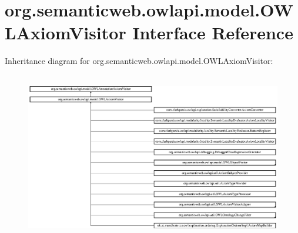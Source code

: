 \hypertarget{interfaceorg_1_1semanticweb_1_1owlapi_1_1model_1_1_o_w_l_axiom_visitor}{\section{org.\-semanticweb.\-owlapi.\-model.\-O\-W\-L\-Axiom\-Visitor Interface Reference}
\label{interfaceorg_1_1semanticweb_1_1owlapi_1_1model_1_1_o_w_l_axiom_visitor}
}
Inheritance diagram for org.\-semanticweb.\-owlapi.\-model.\-O\-W\-L\-Axiom\-Visitor\-:\begin{figure}[H]
\begin{center}
\leavevmode
\includegraphics[height=7.424243cm]{interfaceorg_1_1semanticweb_1_1owlapi_1_1model_1_1_o_w_l_axiom_visitor}
\end{center}
\end{figure}
